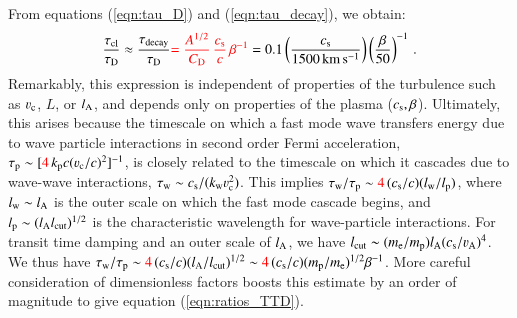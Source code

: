 \documentclass[fleqn,usenatbib,useAMS]{mnras}
\newcommand\cp[1]{{\color{red} #1}}
\begin{document}
From equations (\ref{eqn:tau_D}) and (\ref{eqn:tau_decay}), we obtain:
\begin{equation}
  \frac{\tau_{\rm cl}}{\tau_{\rm D}} \approx \frac{\tau_{\rm decay}}{\tau_{\rm D}}
  \cp{= \frac{A^{1/2}}{C_{\rmn{D}}}\,\frac{c_{\rm s}}{c}\,\beta^{-1}}
  = 0.1 \left( \frac{c_{\rm s}}{1500 \, {\rm km \, s^{-1}}} \right) \left( \frac{\beta}{50} \right)^{-1}\,. 
\label{eqn:ratios_TTD} 
\end{equation}
Remarkably, this expression is independent of properties of the turbulence such as $\varv_{\rm c}$, $L$, or $l_{\rm A}$, and depends only on properties of the plasma ($c_{\rm s},\beta$). Ultimately, this arises because the timescale on which a fast mode wave transfers energy due to wave particle interactions in second order Fermi acceleration, $\tau_{\rm p} \sim [\cp{4\,} k_{\rm p} c (\varv_{\rm c}/c)^{2} ]^{-1}$, is closely related to the timescale on which it cascades due to wave-wave interactions, $\tau_{\rm w} \sim c_{\rm s}/(k_{\rm w} \varv_{\rm c}^{2})$. This implies $\tau_{\rm w}/\tau_{\rm p} \sim \cp{4\,} (c_{\rm s}/c)(l_{\rm w}/l_{\rm p})$, where $l_{\rm w} \sim l_{\rm A}$ is the outer scale on which the fast mode cascade begins, and $l_{\rm p} \sim (l_{\rm A} l_{\rm cut})^{1/2}$ is the characteristic wavelength for wave-particle interactions. For transit time damping and an outer scale of $l_{\rm A}$, we have $l_{\rm cut} \sim (m_{\rm e}/m_{\rm p}) l_{\rm A} (c_{\rm s}/\varv_{\rm A})^{4}$. We thus have $\tau_{\rm w}/\tau_{\rm p} \sim \cp{4\,}(c_{\rm s}/c)(l_{\rm A}/l_{\rm cut})^{1/2} \sim \cp{4\,}(c_{\rm s}/c) (m_{\rm p}/m_{\rm e})^{1/2} \beta^{-1}$. More careful consideration of dimensionless factors boosts this estimate by an order of magnitude to give equation (\ref{eqn:ratios_TTD}). 
\end{document}
